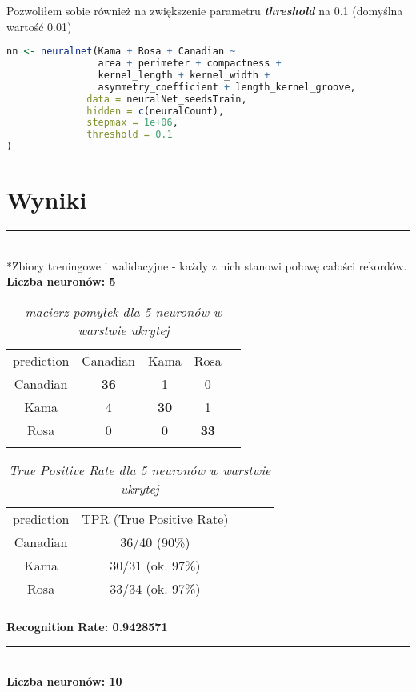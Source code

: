 \documentclass[a4paper,12pt]{article}
\newcommand{\linia}{\rule{\linewidth}{0.5pt}}
\theoremstyle{mytheor}
\begin{document}
Pozwoliłem sobie również na zwiększenie parametru \textbf{\emph{threshold}} na 0.1 (domyślna wartość 0.01)

\begin{lstlisting}[language=R]
nn <- neuralnet(Kama + Rosa + Canadian ~
                area + perimeter + compactness + 
                kernel_length + kernel_width + 
                asymmetry_coefficient + length_kernel_groove,
              data = neuralNet_seedsTrain,
              hidden = c(neuralCount),
              stepmax = 1e+06,
              threshold = 0.1
)
\end{lstlisting}

\section*{Wyniki}
\linia\\
*Zbiory treningowe i walidacyjne - każdy z nich stanowi połowę całości rekordów.\\

\textbf{Liczba neuronów: 5}\\

\begin{table}[H]
\begin{tabular}{ccccc}
prediction & Canadian & Kama & Rosa  &  \\
Canadian & \textbf{36} & 1 & 0 &  \\
Kama & 4 & \textbf{30} & 1 &  \\
Rosa & 0 & 0 & \textbf{33} &  \\
&&&& 
\end{tabular}
\caption{\textit{macierz pomyłek dla 5 neuronów w warstwie ukrytej}}
\label{tab:1}
\end{table}
\begin{table}[H]
\begin{tabular}{ccccc}
prediction & TPR (True Positive Rate) &  \\
Canadian & 36/40 (90\%) & \\
Kama & 30/31 (ok. 97\%) & \\
Rosa & 33/34 (ok. 97\%) & \\
&&
\end{tabular}
\caption{\textit{True Positive Rate dla 5 neuronów w warstwie ukrytej}}
\label{tab:2}
\end{table}
\textbf{Recognition Rate: 0.9428571}\\
\linia\\

\textbf{Liczba neuronów: 10}\\
\end{document}
